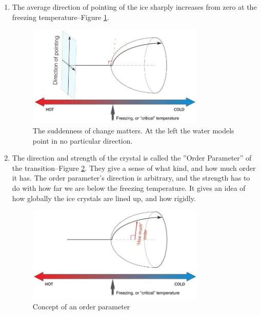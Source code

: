 \documentclass[]{article}
\begin{document}
\begin{enumerate}
	\item The average direction of pointing of the ice sharply increases from zero at the freezing temperature--Figure \ref{fig:water-ice1}.
	\begin{figure}[H]
		\begin{center}
			\caption[The suddenness of change matters]{The suddenness of change matters. At the left the water models point in no particular direction.}\label{fig:water-ice1}
			\includegraphics[width=0.8\textwidth]{phase-transition1}
		\end{center}
	\end{figure}
	\item The direction and strength of the crystal is called the ''Order Parameter'' of the transition--Figure \ref{fig:water-ice2}. They give a sense of what kind, and how much order it has. The order parameter's direction is arbitrary, and the strength has to do with how far we are below the freezing temperature. It gives an idea of how globally the ice crystals are lined up, and how rigidly.
	\begin{figure}[H]
		\begin{center}
			\caption{Concept of an order parameter}\label{fig:water-ice2}
			\includegraphics[width=0.8\textwidth]{water-ice2}
		\end{center}
	\end{figure}



\end{enumerate}
\end{document}
